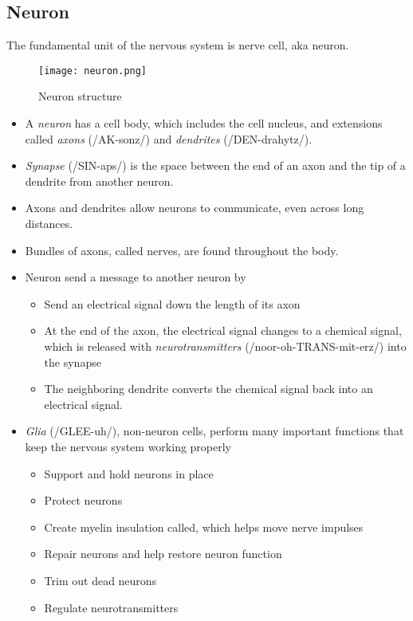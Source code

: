 \subsection{Neuron}
The fundamental unit of the nervous system is nerve cell, \ac{aka} neuron.
\begin{figure}[hbt!]
	\centering
	\texttt{[image: neuron.png]}
	\caption{Neuron structure}
\end{figure}
\begin{itemize}
	\item A \textit{neuron} has a cell body, which includes the cell nucleus, and extensions called \textit{axons} (/AK-sonz/) and \textit{dendrites} (/DEN-drahytz/).
	\item \textit{Synapse} (/SIN-aps/) is the space between the end of an axon and the tip of a dendrite from another neuron.
	\item Axons and dendrites allow neurons to communicate, even across long distances.
	\item Bundles of axons, called nerves, are found throughout the body.
	\item Neuron send a message to another neuron by
	\begin{itemize}
		\item Send an electrical signal down the length of its axon
		\item At the end of the axon, the electrical signal changes to a chemical signal, which is released with \textit{neurotransmitters} (/noor-oh-TRANS-mit-erz/) into the synapse
		\item The neighboring dendrite converts the chemical signal back into an electrical signal. 
	\end{itemize}
	\item \textit{Glia} (/GLEE-uh/), non-neuron cells, perform many important functions that keep the nervous system working properly
	\begin{itemize}
		\item Support and hold neurons in place
		\item Protect neurons
		\item Create myelin insulation called, which helps move nerve impulses
		\item Repair neurons and help restore neuron function
		\item Trim out dead neurons
		\item Regulate neurotransmitters
	\end{itemize}
\end{itemize}
